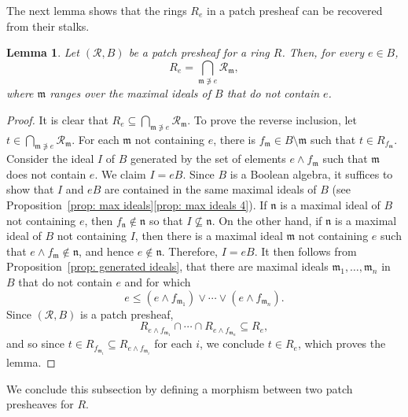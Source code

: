 \documentclass[11pt]{amsart}
\def\m{{\mathfrak m}} %
\newtheorem{lemma}[theorem]{Lemma}
\theoremstyle{definition}
\def\cal{\mathcal}
\begin{document}
The next lemma shows that the rings $R_e$ in a patch presheaf can be recovered from their stalks.


\begin{lemma}\label{stalks lemma} Let $({\cal R}, B)$ be a patch presheaf for a ring $R$. Then, for every $e\in B$, \[R_e = \bigcap_{ {\mathfrak{m}} \not \ni e}{\cal R}_\m,\] where ${\mathfrak{m}}$ ranges over the maximal ideals of $B$ that do not contain $e$.
\end{lemma}

\begin{proof} 
It is clear that $R_e \subseteq \bigcap_{ {\mathfrak{m}} \not \ni e}{\cal R}_\m$. To prove the reverse inclusion, let $t \in \bigcap_{ {\mathfrak{m}} \not \ni e}{\cal R}_\m$.
For each ${\mathfrak{m}}$ not containing $e$, there is $f_{\mathfrak{m}} \in B \setminus {\mathfrak{m}}$ such that $t \in R_{f_{\mathfrak{m}}}$. Consider the ideal $I$ of $B$ generated by the set of elements  $e \wedge f_{\mathfrak{m}}$ such that ${\mathfrak{m}}$ does not contain $e$. We claim $I = eB$. 
Since $B$ is a Boolean algebra, it suffices to show that $I$ and $eB$ are contained in the same maximal ideals of $B$ (see Proposition~\ref{prop: max ideals}\ref{prop: max ideals 4}).  
If ${\mathfrak{n}}$ is a maximal ideal  of $B$ not containing $e$, then $f_{\mathfrak{n}} \not \in {\mathfrak{n}}$ so that $I \not \subseteq {\mathfrak{n}}$.  
On the other hand, if ${\mathfrak{n}}$ is a maximal ideal  of $B$ not containing $I$, then there is a maximal ideal ${\mathfrak{m}}$ not containing $e$ such that $e \wedge f_{\mathfrak{m}} \not \in {\mathfrak{n}}$, and hence $e \not \in {\mathfrak{n}}.$ Therefore, $I = eB$. It then follows from Proposition~\ref{prop: generated ideals}, that there are maximal ideals ${\mathfrak{m}}_1,\ldots,{\mathfrak{m}}_n$ in $B$ that do not contain $e$ and for which $$e \le (e \wedge f_{{\mathfrak{m}}_1}) \vee \cdots \vee (e \wedge f_{{\mathfrak{m}}_n}).$$ Since $({\cal R}, B)$ is a patch presheaf, $$ R_{e \wedge f_{{\mathfrak{m}}_1}} \cap  \cdots \cap R_{e \wedge f_{{\mathfrak{m}}_n}}\subseteq R_e,$$
and so since $t \in R_{f_{{\mathfrak{m}}_i}} \subseteq R_{e \wedge f_{{\mathfrak{m}}_i}}$ for each $i$, we conclude $t \in R_e$, which proves the lemma. 
\end{proof} 

We conclude this subsection by defining a morphism between two patch presheaves for $R$.
\end{document}
